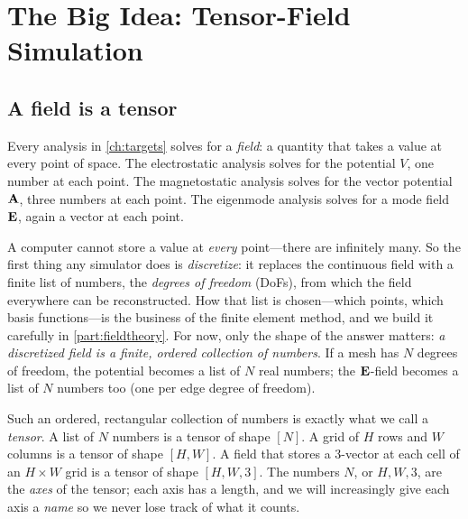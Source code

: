 \chapter{The Big Idea: Tensor-Field Simulation}
\label{ch:bigidea}


\section{A field is a tensor}

Every analysis in \cref{ch:targets} solves for a \emph{field}: a quantity that
takes a value at every point of space. The electrostatic analysis solves for the
potential $V$, one number at each point. The magnetostatic analysis solves for
the vector potential $\mathbf{A}$, three numbers at each point. The eigenmode analysis
solves for a mode field $\mathbf{E}$, again a vector at each point.

A computer cannot store a value at \emph{every} point---there are infinitely
many. So the first thing any simulator does is \emph{discretize}: it replaces the
continuous field with a finite list of numbers, the \emph{degrees of freedom}
(DoFs), from which the field everywhere can be reconstructed. How that list is
chosen---which points, which basis functions---is the business of the finite
element method, and we build it carefully in \cref{part:fieldtheory}. For now,
only the shape of the answer matters: \emph{a discretized field is a finite,
ordered collection of numbers}. If a mesh has $N$ degrees of freedom, the
potential becomes a list of $N$ real numbers; the $\mathbf{E}$-field becomes a list of
$N$ numbers too (one per edge degree of freedom).

Such an ordered, rectangular collection of numbers is exactly what we call a
\emph{tensor}. A list of $N$ numbers is a tensor of shape $[N]$. A grid of $H$
rows and $W$ columns is a tensor of shape $[H, W]$. A field that stores a
3-vector at each cell of an $H \times W$ grid is a tensor of shape $[H, W, 3]$.
The numbers $N$, or $H, W, 3$, are the \emph{axes} of the tensor; each axis has a
length, and we will increasingly give each axis a \emph{name} so we never lose
track of what it counts.

